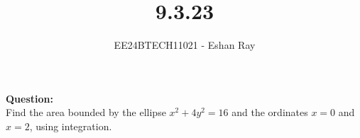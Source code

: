 \documentclass[journal]{IEEEtran}
\begin{document}

\vspace{3cm}

\title{9.3.23}
\author{EE24BTECH11021 - Eshan Ray}

{\let\newpage\relax\maketitle}

\renewcommand{\thefigure}{\theenumi}
\renewcommand{\thetable}{\theenumi}
\setlength{\intextsep}{10pt} %




\textbf{Question: }\\
Find the area bounded by the ellipse $x^2 + 4y^2 = 16$ and the ordinates $x = 0$ and $x = 2$, using integration.\\
\end{document}
